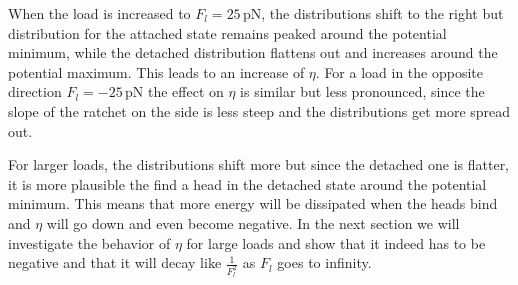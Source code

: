 \documentclass[aps,pre,twocolumn,showpacs,showkeys,a4paper]{revtex4}
\begin{document}
When the load is increased to $F_l = 25 \, \mathrm{pN}$, the distributions shift to the right but distribution for the attached state remains peaked around the potential minimum, while the detached distribution flattens out and increases around the potential maximum. 
This leads to an increase of $\eta$. 
For a load in the opposite direction $F_l = -25 \, \mathrm{pN}$ the effect on $\eta$ is similar but less pronounced, since the slope of the ratchet on the side is less steep and the distributions get more spread out. 


For larger loads, the distributions shift more but since the detached one is flatter, it is more plausible the find a head in the detached state around the potential minimum. 
This means that more energy will be dissipated when the heads bind and $\eta$ will go down and even become negative. 
In the next section we will investigate the behavior of $\eta$ for large loads and show that it indeed has to be negative and that it will decay like $\frac{1}{F_l^2}$ as $F_l$ goes to infinity.
\end{document}
